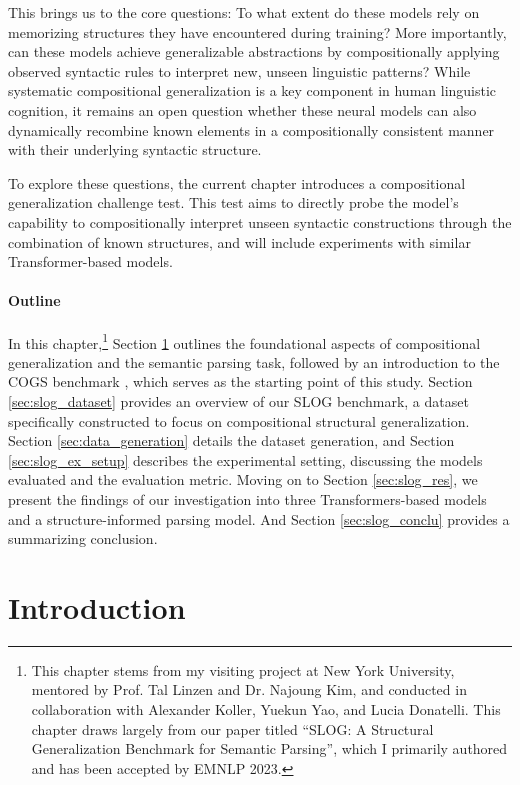 This brings us to the core questions: To what extent do these models rely on memorizing structures they have encountered during training? More importantly, can these models achieve generalizable abstractions by compositionally applying observed syntactic rules to interpret new, unseen linguistic patterns? While systematic compositional generalization is a key component in human linguistic cognition, it remains an open question whether these neural models can also dynamically recombine known elements in a compositionally consistent manner with their underlying syntactic structure.



To explore these questions, the current chapter introduces a compositional generalization challenge test. This test aims to directly probe the model's capability to compositionally interpret unseen syntactic constructions through the combination of known structures, and will include experiments with similar Transformer-based models.

\paragraph{Outline} In this chapter,\footnote{This chapter stems from my visiting project at New York University, mentored by Prof. Tal Linzen and Dr. Najoung Kim, and conducted in collaboration with Alexander Koller, Yuekun Yao, and Lucia Donatelli. This chapter draws largely from our paper titled ``SLOG: A Structural Generalization Benchmark for Semantic Parsing'', which I primarily authored and has been accepted by EMNLP 2023.} Section \ref{sec:slog_intro} outlines the foundational aspects of compositional generalization and the semantic parsing task, followed by an introduction to the COGS benchmark \citep{kim-linzen-2020-cogs}, which serves as the starting point of this study. Section \ref{sec:slog_dataset} provides an overview of our SLOG benchmark, a dataset specifically constructed to focus on compositional structural generalization. Section \ref{sec:data_generation} details the dataset generation, and Section \ref{sec:slog_ex_setup} describes the experimental setting, discussing the models evaluated and the evaluation metric. Moving on to Section \ref{sec:slog_res}, we present the findings of our investigation into three Transformers-based models and a structure-informed parsing model. And Section \ref{sec:slog_conclu} provides a summarizing conclusion. 

\section{Introduction} \label{sec:slog_intro}

